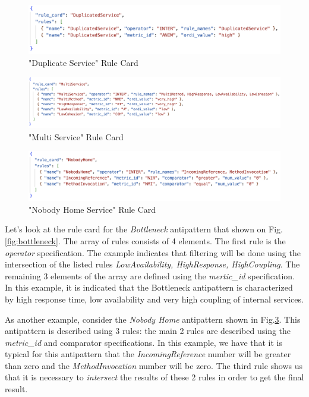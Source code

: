 \documentclass[12pt, times]{article}
\begin{document}
	\begin{figure}[h]
		\centering
		\includegraphics[scale=0.7]{duplicate}
		\caption{"Duplicate Service" Rule Card}
		\label{fig:duplicate}
	\end{figure}
	
	\clearpage		
	
	\begin{figure}[h]
		\centering
		\includegraphics[scale=0.6]{multiservice}
		\caption{"Multi Service" Rule Card}
		\label{fig:multiservice}
	\end{figure}
	
	\begin{figure}[h]
		\centering
		\includegraphics[scale=0.6]{nobody_home}
		\caption{"Nobody Home Service" Rule Card}
		\label{fig:nobody_home}
	\end{figure}
	
	\hspace*{5mm} Let's look at the rule card for the \textit{Bottleneck} antipattern that shown on Fig.\ref{fig:bottleneck}. The array of rules consists of 4 elements. The first rule is the \textit{operator} specification. The example indicates that filtering will be done using the intersection of the listed rules \textit{LowAvailability, HighResponse, HighCoupling}. The remaining 3 elements of the array are defined using the \textit{mertic\_id} specification. In this example, it is indicated that the Bottleneck antipattern is characterized by high response time, low availability and very high coupling of internal services. 
	
	\hspace*{5mm} As another example, consider the \textit{Nobody Home} antipattern shown in Fig.\ref{fig:nobody_home}. This antipattern is described using 3 rules: the main 2 rules are described using the \textit{metric\_id} and comparator specifications. In this example, we have that it is typical for this antipattern that the \textit{IncomingReference} number will be greater than zero and the \textit{MethodInvocation} number will be zero. The third rule shows us that it is necessary to \textit{intersect} the results of these 2 rules in order to get the final result. 
	
\end{document}
